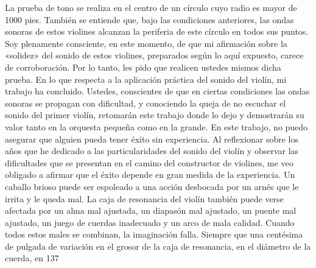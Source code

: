 La prueba de tono se realiza en el centro de un círculo cuyo radio es mayor de 1000 pies. También se entiende que, bajo las condiciones anteriores, las ondas sonoras de estos violines alcanzan la periferia de este círculo en todos sus puntos.
Soy plenamente consciente, en este momento, de que mi afirmación sobre la «solidez» del sonido de estos violines, preparados según lo aquí expuesto, carece de corroboración. Por lo tanto, les pido que realicen ustedes mismos dicha prueba. En lo que respecta a la aplicación práctica del sonido del violín, mi trabajo ha concluido. Ustedes, conscientes de que en ciertas condiciones las ondas sonoras se propagan con dificultad, y conociendo la queja de no escuchar el sonido del primer violín, retomarán este trabajo donde lo dejo y demostrarán su valor tanto en la orquesta pequeña como en la grande.
En este trabajo, no puedo asegurar que alguien pueda tener éxito sin experiencia. Al reflexionar sobre los años que he dedicado a las particularidades del sonido del violín y observar las dificultades que se presentan en el camino del constructor de violines, me veo obligado a afirmar que el éxito depende en gran medida de la experiencia. Un caballo brioso puede ser espoleado a una acción desbocada por un arnés que le irrita y le queda mal. La caja de resonancia del violín también puede verse afectada por un alma mal ajustada, un diapasón mal ajustado, un puente mal ajustado, un juego de cuerdas inadecuado y un arco de mala calidad.
Cuando todos estos males se combinan, la imaginación falla.
Siempre que una centésima de pulgada de variación en el grosor de la caja de resonancia, en el diámetro de la cuerda, en 137

